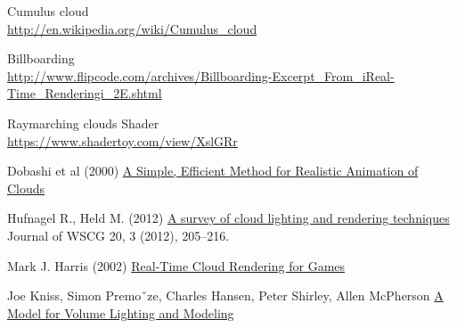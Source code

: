 Cumulus cloud \\
\underline{http://en.wikipedia.org/wiki/Cumulus\_cloud}

Billboarding \\
{\footnotesize \underline{http://www.flipcode.com/archives/Billboarding-Excerpt\_From\_iReal-Time\_Renderingi\_2E.shtml}}

Raymarching clouds Shader \\
\underline{https://www.shadertoy.com/view/XslGRr}


Dobashi et al (2000) \underline{A Simple, Efficient Method for Realistic Animation of Clouds}

Hufnagel R., Held M. (2012) \underline{A survey of cloud lighting and rendering techniques} Journal of WSCG 20, 3 (2012), 205–216.

Mark J. Harris (2002) \underline{Real-Time Cloud Rendering for Games}

Joe Kniss, Simon Premoˇze, Charles Hansen, Peter Shirley, Allen McPherson \underline{A Model for Volume Lighting and Modeling}